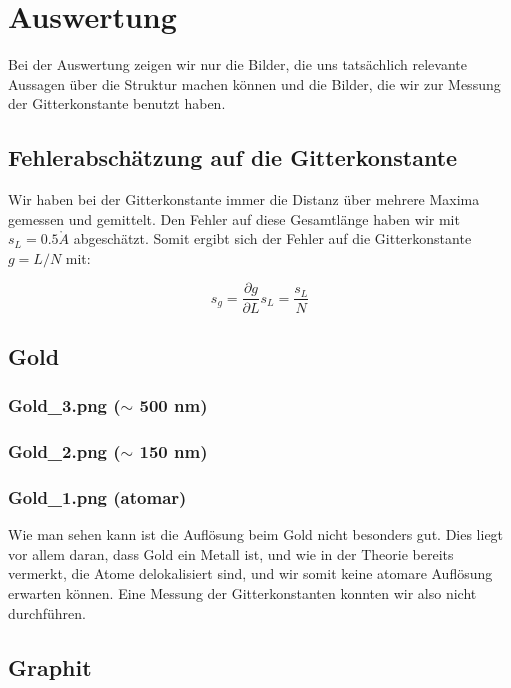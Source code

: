 \section{Auswertung}

Bei der Auswertung zeigen wir nur die Bilder, die uns tatsächlich relevante Aussagen über die Struktur machen können und die Bilder, die wir zur Messung der Gitterkonstante benutzt haben.

\subsection{Fehlerabschätzung auf die Gitterkonstante}

Wir haben bei der Gitterkonstante immer die Distanz über mehrere Maxima gemessen und gemittelt. Den Fehler auf diese Gesamtlänge haben wir mit $s_L = 0.5 \mathring A$ abgeschätzt. Somit ergibt sich der Fehler auf die Gitterkonstante $g=L/N$ mit:

$$s_g = \frac{\partial g}{\partial L}s_L = \frac{s_L}{N}$$

\subsection{Gold}

\subsubsection{Gold\_3.png ($\sim$ 500 nm)}
\subsubsection{Gold\_2.png ($\sim$ 150 nm)}
\subsubsection{Gold\_1.png (atomar)}

Wie man sehen kann ist die Auflösung beim Gold nicht besonders gut. Dies liegt vor allem daran, dass Gold ein Metall ist, und wie in der Theorie bereits vermerkt, die Atome delokalisiert sind, und wir somit keine atomare Auflösung erwarten können. Eine Messung der Gitterkonstanten konnten wir also nicht durchführen.

\subsection{Graphit}

